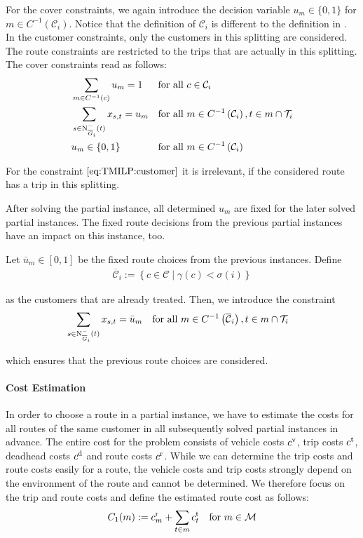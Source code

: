 For the cover constraints, we again introduce the decision variable $u_m\in\{0,1\}$ for $m\in C^{-1}\left(\mathcal{C}_i\right)$.  Notice that the definition of $\mathcal{C}_i$ is different to the definition in . In the customer constraints, only the customers in this splitting are considered. The route constraints are restricted to the trips that are actually in this splitting. The cover constraints read as follows:
\begin{align}
	& \sum_{m\in C^{-1}(c)} u_m = 1 && \text{for all } c\in\mathcal{C}_i \label{eq:TMILP:customer} \\
	& \sum_{s\in\operatorname{N}_{\overline{G}_i}^-(t)} x_{s,t} = u_m && \text{for all } m\in C^{-1}\left(\mathcal{C}_i\right), t\in m\cap\mathcal{T}_i \label{eq:TMILP:route} \\
	& u_m\in\{0,1\} && \text{for all } m\in C^{-1}\left(\mathcal{C}_i\right) \label{eq:TMILP:um}
\end{align}

For the constraint $\eqref{eq:TMILP:customer}$ it is irrelevant, if the considered route has a trip in this splitting.

After solving the partial instance, all determined $u_m$ are fixed for the later solved partial instances. The fixed route decisions from the previous partial instances have an impact on this instance, too. 

Let $\bar{u}_m\in[0,1]$ be the fixed route choices from the previous instances. Define
\begin{align*}
	\overline{\mathcal{C}}_i := \left\{c\in\mathcal{C}\mid \gamma\left(c\right)<\sigma(i)\right\}
\end{align*}

as the customers that are already treated. Then, we introduce the constraint
\begin{align}
	&\sum_{s\in\operatorname{N}_{\overline{G}_i}^-(t)} x_{s,t} = \bar{u}_m && \text{for all } m\in C^{-1}\left(\overline{\mathcal{C}}_i\right), t\in m\cap\mathcal{T}_i \label{eq:TMILP:route_fix}
\end{align}

which ensures that the previous route choices are considered.

\paragraph{Cost Estimation} \parfill

In order to choose a route in a partial instance, we have to estimate the costs for all routes of the same customer in all subsequently solved partial instances in advance. The entire cost for the problem consists of vehicle costs $c^{\operatorname{v}}$, trip costs $c^{\operatorname{t}}$, deadhead costs $c^{\operatorname{d}}$ and route costs $c^{\operatorname{r}}$. While we can determine the trip costs and route costs easily for a route, the vehicle costs and trip costs strongly depend on the environment of the route and cannot be determined. We therefore focus on the trip and route costs and define the estimated route cost as follows:
\begin{align*}
	C_1(m) := c^{\operatorname{r}}_m + \sum_{t\in m}c^{\operatorname{t}}_t && \text{for } m\in\mathcal{M}
\end{align*}

